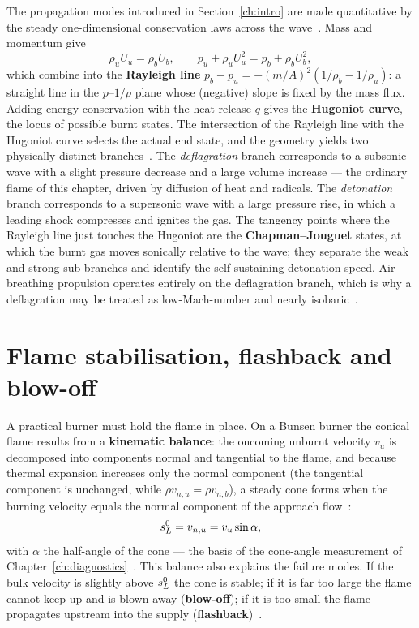 The propagation modes introduced in Section~\ref{ch:intro} are made quantitative by the steady one-dimensional conservation laws across the wave~\cite{lecture4,glassman2014combustion}. Mass and momentum give
\begin{equation}
\rho_u U_u=\rho_b U_b,\qquad p_u+\rho_u U_u^2=p_b+\rho_b U_b^2,
\end{equation}
which combine into the \textbf{Rayleigh line} $p_b-p_u=-(\dot m/A)^2(1/\rho_b-1/\rho_u)$: a straight line in the $p$--$1/\rho$ plane whose (negative) slope is fixed by the mass flux. Adding energy conservation with the heat release $q$ gives the \textbf{Hugoniot curve}, the locus of possible burnt states. The intersection of the Rayleigh line with the Hugoniot curve selects the actual end state, and the geometry yields two physically distinct branches~\cite{lecture4,glassman2014combustion}. The \emph{deflagration} branch corresponds to a subsonic wave with a slight pressure decrease and a large volume increase --- the ordinary flame of this chapter, driven by diffusion of heat and radicals. The \emph{detonation} branch corresponds to a supersonic wave with a large pressure rise, in which a leading shock compresses and ignites the gas. The tangency points where the Rayleigh line just touches the Hugoniot are the \textbf{Chapman--Jouguet} states, at which the burnt gas moves sonically relative to the wave; they separate the weak and strong sub-branches and identify the self-sustaining detonation speed. Air-breathing propulsion operates entirely on the deflagration branch, which is why a deflagration may be treated as low-Mach-number and nearly isobaric~\cite{lecture4}.

\section{Flame stabilisation, flashback and blow-off}

A practical burner must hold the flame in place. On a Bunsen burner the conical flame results from a \textbf{kinematic balance}: the oncoming unburnt velocity $v_u$ is decomposed into components normal and tangential to the flame, and because thermal expansion increases only the normal component (the tangential component is unchanged, while $\rho v_{n,u}=\rho v_{n,b}$), a steady cone forms when the burning velocity equals the normal component of the approach flow~\cite{lecture5}:
\begin{equation}
s_L^{0}=v_{n,u}=v_u\sin\alpha ,
\label{eq:bunsen}
\end{equation}
with $\alpha$ the half-angle of the cone --- the basis of the cone-angle measurement of Chapter~\ref{ch:diagnostics}~\cite{lecture5}. This balance also explains the failure modes. If the bulk velocity is slightly above $s_L^{0}$ the cone is stable; if it is far too large the flame cannot keep up and is blown away (\textbf{blow-off}); if it is too small the flame propagates upstream into the supply (\textbf{flashback})~\cite{lecture5}.

